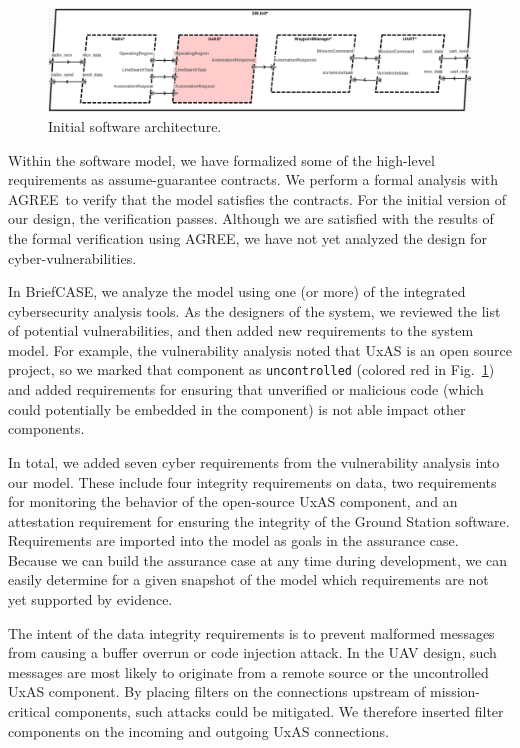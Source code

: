 \documentclass[global,twocolumn]{svjour}
\newcommand{\figref}[1]{Fig.~\ref{#1}}
\newcommand{\brfcs}{BriefCASE}
\newcommand{\agr}{AGREE}
\begin{document}
\begin{figure}[h]
	\centering
	\includegraphics[width=2\columnwidth]{figs/sw-initial.PNG}
	\caption{Initial software architecture.}
	\label{fig:sw-initial}
\end{figure}

Within the software model, we have formalized some of the high-level requirements as assume-guarantee contracts.
%
We perform a formal analysis with \agr\ to verify that the model satisfies the contracts.
%
For the initial version of our design, the verification passes.
%
Although we are satisfied with the results of the formal verification using \agr, we have not yet analyzed the design for cyber-vulnerabilities.

In \brfcs, we analyze the model using one (or more) of the integrated cybersecurity analysis tools.
%
As the designers of the system, we reviewed the list of potential vulnerabilities, and then added new requirements to the system model.
%
For example, the vulnerability analysis noted that UxAS is an open source project, so we marked that component as \texttt{uncontrolled} (colored red in \figref{fig:sw-initial}) and added requirements for ensuring that unverified or malicious code (which could potentially be embedded in the component) is not able impact other components.

In total, we added seven cyber requirements from the vulnerability analysis into our model.
%
These include four integrity requirements on data, two requirements for monitoring the behavior of the open-source UxAS component, and an attestation requirement for ensuring the integrity of the Ground Station software.
%
Requirements are imported into the model as goals in the assurance case.
%
Because we can build the assurance case at any time during development, we can easily determine for a given snapshot of the model which requirements are not yet supported by evidence.

The intent of the data integrity requirements is to prevent malformed messages from causing a buffer overrun or code injection attack.
%
In the UAV design, such messages are most likely to originate from a remote source or the uncontrolled UxAS component.
%
By placing filters on the connections upstream of mission-critical components, such attacks could be mitigated.
%
We therefore inserted filter components on the incoming and outgoing UxAS connections.
\end{document}
